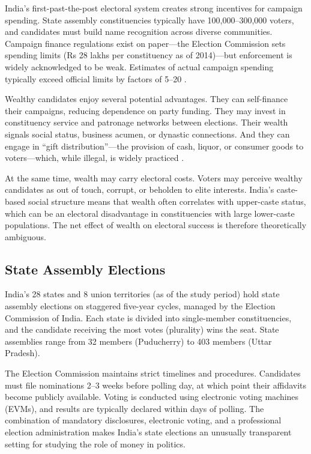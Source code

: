 \documentclass[12pt]{article}
\begin{document}
India's first-past-the-post electoral system creates strong incentives for campaign spending. State assembly constituencies typically have 100,000--300,000 voters, and candidates must build name recognition across diverse communities. Campaign finance regulations exist on paper---the Election Commission sets spending limits (Rs 28 lakhs per constituency as of 2014)---but enforcement is widely acknowledged to be weak. Estimates of actual campaign spending typically exceed official limits by factors of 5--20 \citep{kapur2018rethinking}.

Wealthy candidates enjoy several potential advantages. They can self-finance their campaigns, reducing dependence on party funding. They may invest in constituency service and patronage networks between elections. Their wealth signals social status, business acumen, or dynastic connections. And they can engage in ``gift distribution''---the provision of cash, liquor, or consumer goods to voters---which, while illegal, is widely practiced \citep{bjorkman2014vote}.

At the same time, wealth may carry electoral costs. Voters may perceive wealthy candidates as out of touch, corrupt, or beholden to elite interests. India's caste-based social structure means that wealth often correlates with upper-caste status, which can be an electoral disadvantage in constituencies with large lower-caste populations. The net effect of wealth on electoral success is therefore theoretically ambiguous.

\subsection{State Assembly Elections}

India's 28 states and 8 union territories (as of the study period) hold state assembly elections on staggered five-year cycles, managed by the Election Commission of India. Each state is divided into single-member constituencies, and the candidate receiving the most votes (plurality) wins the seat. State assemblies range from 32 members (Puducherry) to 403 members (Uttar Pradesh).

The Election Commission maintains strict timelines and procedures. Candidates must file nominations 2--3 weeks before polling day, at which point their affidavits become publicly available. Voting is conducted using electronic voting machines (EVMs), and results are typically declared within days of polling. The combination of mandatory disclosures, electronic voting, and a professional election administration makes India's state elections an unusually transparent setting for studying the role of money in politics.
\end{document}
